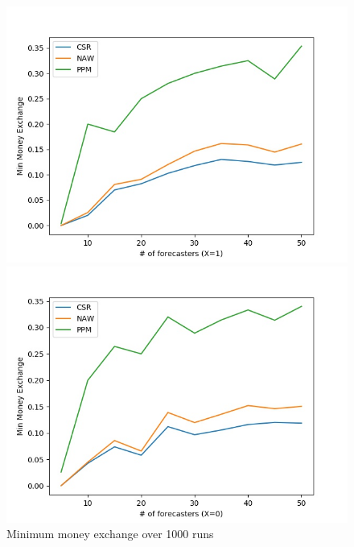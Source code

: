 \documentclass[english,10pt]{article}
\begin{document}
\begin{enumerate}
        	\begin{figure}[H]
        	\centering
        	\begin{minipage}{0.48\textwidth}
        	\includegraphics[width = \textwidth]{(Beta_0dot3_0dot3)Min_MnEx(X=1).jpg}
        	\end{minipage}
        	\begin{minipage}{0.48\textwidth}
        	\includegraphics[width = \textwidth]{(Beta_0dot3_0dot3)Min_MnEx(X=0).jpg}
        	\end{minipage}
        	\caption{Minimum money exchange over 1000 runs}
        	\end{figure}
	

\end{enumerate}
\end{document}
